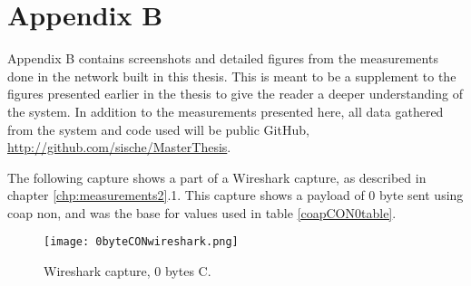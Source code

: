 \chapter{Appendix B}
\label{chp:appendixb}

Appendix B contains screenshots and detailed figures from the measurements done in the network built in this thesis. This is meant to be a supplement to the figures presented earlier in the thesis to give the reader a deeper understanding of the system. In addition to the measurements presented here, all data gathered from the system and code used will be public GitHub, \url{http://github.com/sische/MasterThesis}. 

The following capture shows a part of a Wireshark capture, as described in chapter \ref{chp:measurements2}.1. This capture shows a \gls{payload} of 0 byte sent using \gls{coap} \gls{non}, and was the base for values used in table \ref{coapCON0table}. 

\begin{figure}[ht]
    \centering
    \texttt{[image: 0byteCONwireshark.png]}    
    \caption{Wireshark capture, 0 bytes C. }
    \label{fig:wireshark0byteCONappendixB}
\end{figure}


